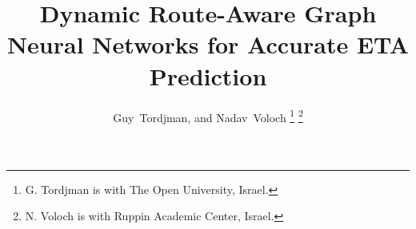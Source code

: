 \documentclass[journal]{IEEEtran}
\title{Dynamic Route-Aware Graph Neural Networks for Accurate ETA Prediction}
\author{Guy~Tordjman, and Nadav~Voloch%
\thanks{G. Tordjman is with The Open University, Israel.}%
\thanks{N. Voloch is with Ruppin Academic Center, Israel.}%
}
\begin{document}
\maketitle

\begin{abstract}

\end{abstract}

\begin{IEEEkeywords}

\end{IEEEkeywords}











\balance

\end{document}
